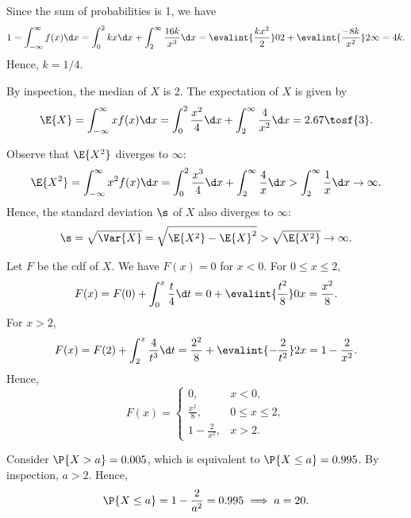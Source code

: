 \begin{solution}
    Since the sum of probabilities is 1, we have \[1 = \int_{-\infty}^\infty f(x) \d x = \int_0^2 kx \d x + \int_2^\infty \frac{16k}{x^3} \d x = \evalint{\frac{kx^2}2}02 + \evalint{\frac{-8k}{x^{2}}}2\infty = 4k.\] Hence, $k = 1/4$.

    By inspection, the median of $X$ is 2. The expectation of $X$ is given by \[\E{X} = \int_{-\infty}^\infty x f(x) \d x = \int_0^2 \frac{x^2}4 \d x + \int_2^\infty \frac{4}{x^2} \d x = 2.67 \tosf{3}.\]

    Observe that $\E{X^2}$ diverges to $\infty$: \[\E{X^2} = \int_{-\infty}^\infty x^2 f(x) \d x = \int_0^2 \frac{x^3}4 \d x + \int_2^\infty \frac{4}{x} \d x > \int_2^\infty \frac{1}{x} \d x \to \infty.\] Hence, the standard deviation $\s$ of $X$ also diverges to $\infty$: \[\s = \sqrt{\Var{X}} = \sqrt{\E{X^2} - \E{X}^2} > \sqrt{\E{X^2}} \to \infty.\]

    Let $F$ be the cdf of $X$. We have $F(x) = 0$ for $x < 0$. For $0 \leq x \leq 2$, \[F(x) = F(0) + \int_0^x \frac{t}{4} \d t = 0 + \evalint{\frac{t^2}{8}}0x = \frac{x^2}{8}.\] For $x > 2$, \[F(x) = F(2) + \int_2^x \frac4{t^3} \d t = \frac{2^2}{8} + \evalint{-\frac{2}{t^2}}2x = 1 - \frac2{x^2}.\] Hence, \[F(x) = \begin{cases}
        0, & x < 0,\\
        \frac{x^2}8, & 0 \leq x \leq 2,\\
        1 - \frac2{x^2}, & x > 2.
    \end{cases}\]
    
    \begin{figure}[H]
    \centering
    \end{figure}
    
    Consider $\P{X > a} = 0.005$, which is equivalent to $\P{X \leq a} = 0.995$. By inspection, $a > 2$. Hence, \[\P{X \leq a} = 1 - \frac{2}{a^2} = 0.995 \implies a = 20.\]
\end{solution}

